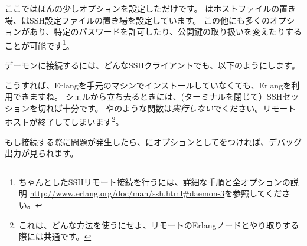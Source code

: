 ここではほんの少しオプションを設定しただけです。
はホストファイルの置き場、はSSH設定ファイルの置き場を設定しています。
この他にも多くのオプションがあり、特定のパスワードを許可したり、公開鍵の取り扱いを変えたりすることが可能です\footnote{ちゃんとしたSSHリモート接続を行うには、詳細な手順と全オプションの説明 \href{http://www.erlang.org/doc/man/ssh.html\#daemon-3}{http://www.erlang.org/doc/man/ssh.html\#daemon-3}を参照してください。}。


デーモンに接続するには、どんなSSHクライアントでも、以下のようにします。


こうすれば、Erlangを手元のマシンでインストールしていなくても、Erlangを利用できますね。
シェルから立ち去るときには、(ターミナルを閉じて）SSHセッションを切れば十分です。
やのような関数は\emph{実行しない}でください。リモートホストが終了してしまいます\footnote{これは、どんな方法を使うにせよ、リモートのErlangノードとやり取りする際には共通です。}。

もし接続する際に問題が発生したら、にオプションとしてをつければ、デバッグ出力が見られます。

